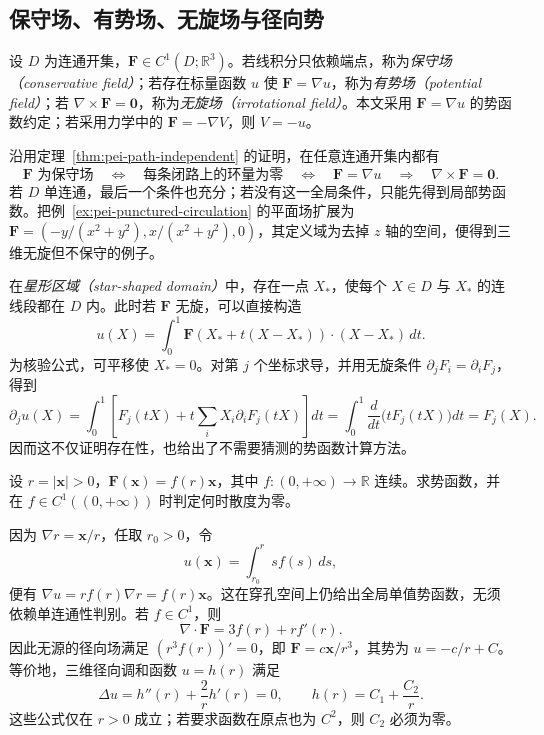 \subsection{保守场、有势场、无旋场与径向势}

设 $D$ 为连通开集，$\boldsymbol F\in C^1(D;\mathbb R^3)$。若线积分只依赖端点，称为\emph{保守场（conservative field）}；若存在标量函数 $u$ 使 $\boldsymbol F=\nabla u$，称为\emph{有势场（potential field）}；若 $\nabla\times\boldsymbol F=\boldsymbol0$，称为\emph{无旋场（irrotational field）}。本文采用 $\boldsymbol F=\nabla u$ 的势函数约定；若采用力学中的 $\boldsymbol F=-\nabla V$，则 $V=-u$。

沿用定理~\ref{thm:pei-path-independent} 的证明，在任意连通开集内都有
\begin{equation}
\label{eq:pei-conservative-equivalences}
\boldsymbol F\text{ 为保守场}
\quad\Longleftrightarrow\quad
\text{每条闭路上的环量为零}
\quad\Longleftrightarrow\quad
\boldsymbol F=\nabla u
\quad\Longrightarrow\quad
\nabla\times\boldsymbol F=\boldsymbol0.
\end{equation}
若 $D$ 单连通，最后一个条件也充分；若没有这一全局条件，只能先得到局部势函数。把例~\ref{ex:pei-punctured-circulation} 的平面场扩展为
$\boldsymbol F=(-y/(x^2+y^2),x/(x^2+y^2),0)$，其定义域为去掉 $z$ 轴的空间，便得到三维无旋但不保守的例子。

在\emph{星形区域（star-shaped domain）}中，存在一点 $X_*$，使每个 $X\in D$ 与 $X_*$ 的连线段都在 $D$ 内。此时若 $\boldsymbol F$ 无旋，可以直接构造
\begin{equation}
\label{eq:pei-star-shaped-potential}
u(X)=\int_0^1\boldsymbol F(X_*+t(X-X_*))\cdot(X-X_*)\,dt.
\end{equation}
为核验公式，可平移使 $X_*=0$。对第 $j$ 个坐标求导，并用无旋条件 $\partial_jF_i=\partial_iF_j$，得到
\[
\partial_j u(X)
=\int_0^1\left[F_j(tX)+t\sum_iX_i\partial_iF_j(tX)\right]dt
=\int_0^1\frac d{dt}\bigl(tF_j(tX)\bigr)dt=F_j(X).
\]
因而这不仅证明存在性，也给出了不需要猜测的势函数计算方法。

\begin{example}
\label{ex:pei-radial-potential}
设 $r=|\boldsymbol x|>0$，$\boldsymbol F(\boldsymbol x)=f(r)\boldsymbol x$，其中 $f:(0,+\infty)\to\mathbb R$ 连续。求势函数，并在 $f\in C^1((0,+\infty))$ 时判定何时散度为零。
\end{example}
\begin{solve}
因为 $\nabla r=\boldsymbol x/r$，任取 $r_0>0$，令
\[
u(\boldsymbol x)=\int_{r_0}^{r}s f(s)\,ds,
\]
便有 $\nabla u=rf(r)\nabla r=f(r)\boldsymbol x$。这在穿孔空间上仍给出全局单值势函数，无须依赖单连通性判别。若 $f\in C^1$，则
\[
\nabla\cdot\boldsymbol F=3f(r)+rf'(r).
\]
因此无源的径向场满足 $(r^3f(r))'=0$，即 $\boldsymbol F=c\boldsymbol x/r^3$，其势为 $u=-c/r+C$。等价地，三维径向调和函数 $u=h(r)$ 满足
\[
\Delta u=h''(r)+\frac2r h'(r)=0,
\qquad h(r)=C_1+\frac{C_2}r.
\]
这些公式仅在 $r>0$ 成立；若要求函数在原点也为 $C^2$，则 $C_2$ 必须为零。
\end{solve}

